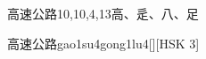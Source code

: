 \begin{entry}{高速公路}{10,10,4,13}{⾼、⾡、⼋、⾜}
  \begin{phonetics}{高速公路}{gao1su4gong1lu4}[][HSK 3]
  \end{phonetics}
\end{entry}
